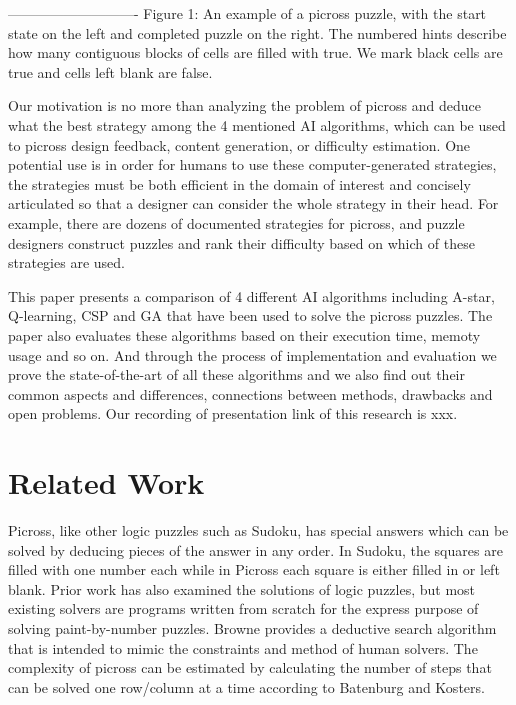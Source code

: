 \documentclass{svproc}
\begin{document}
	----------------------------
	Figure 1: An example of a picross puzzle, with the start state on the left and completed puzzle on the right. The numbered hints describe how many contiguous blocks of cells are filled with true. We mark black cells are true and cells left blank are false. 
	
	Our motivation is no more than analyzing the problem of picross and deduce what the best strategy among the 4 mentioned AI algorithms, which can be used to picross design feedback, content generation, or difficulty estimation. One potential use is in order for humans to use these computer-generated strategies, the strategies must be both efficient in the domain of interest and concisely articulated so that a designer can consider the whole strategy in their head. For example, there are dozens of documented strategies for picross\cite{picross1}, and puzzle designers construct puzzles and rank their difficulty based on which of these strategies are used\cite{picross2}.
	
	This paper presents a comparison of 4 different AI algorithms including A-star, Q-learning, CSP and GA that have been used to solve the picross puzzles. The paper also evaluates these algorithms based on their execution time, memoty usage and so on. And through the process of implementation and evaluation we prove the state-of-the-art of all these algorithms and we also find out their common aspects and differences, connections between methods, drawbacks and open problems. Our recording of presentation link of this research is xxx.

	
	\section{Related Work}
Picross, like other logic puzzles such as Sudoku, has special answers which can be solved by deducing pieces of the answer in any order. In Sudoku, the squares are filled with one number each while in Picross each square is either filled in or left blank. Prior work has also examined the solutions of logic puzzles, but most existing solvers are programs written from scratch for the express purpose of solving paint-by-number puzzles\cite{5.1.1,5.1.2,5.1.3,5.1.7}. Browne provides a deductive search algorithm that is intended to mimic the constraints and method of human solvers\cite{Browne}. The complexity of picross can be estimated by calculating the number of steps that can be solved one row/column at a time according to Batenburg and Kosters\cite{Batenburg and Kosters}. 
\end{document}
